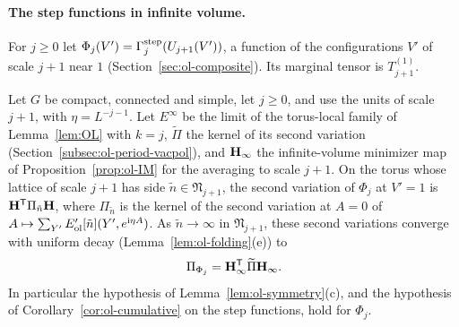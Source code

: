 \paragraph{The step functions in infinite volume.} For $j\ge0$ let $\Phi_j(V')=\Gamma^{\rm step}_j(U_{j+1}(V'))$, a function of the configurations $V'$ of scale $j+1$ near $1$ (Section~\ref{sec:ol-composite}). Its marginal tensor is $T^{(1)}_{j+1}$.

\begin{lemma}\label{lem:ol-limits}
Let $G$ be compact, connected and simple, let $j\ge0$, and use the units of scale $j+1$, with $\eta=L^{-j-1}$. Let $E^\infty$ be the limit of the torus-local family of Lemma~\ref{lem:OL} with $k=j$, $\widetilde\Pi$ the kernel of its second variation (Section~\ref{subsec:ol-period-vacpol}), and $\mathbf H_\infty$ the infinite-volume minimizer map of Proposition~\ref{prop:ol-IM} for the averaging to scale $j+1$. On the torus whose lattice of scale $j+1$ has side $\tilde n\in\mathfrak N_{j+1}$, the second variation of $\Phi_j$ at $V'=1$ is $\mathbf H^{\sf T}\Pi_{\tilde n}\mathbf H$, where $\Pi_{\tilde n}$ is the kernel of the second variation at $A=0$ of $A\mapsto\sum_{Y'}E'_{\rm ol}[\tilde n](Y',e^{\mathrm i\eta A})$. As $\tilde n\to\infty$ in $\mathfrak N_{j+1}$, these second variations converge with uniform decay (Lemma~\ref{lem:ol-folding}(e)) to
\[
\Pi_{\Phi_j}=\mathbf H_\infty^{\sf T}\widetilde\Pi\mathbf H_\infty .
\]
In particular the hypothesis of Lemma~\ref{lem:ol-symmetry}(c), and the hypothesis of Corollary~\ref{cor:ol-cumulative} on the step functions, hold for $\Phi_j$.
\end{lemma}

